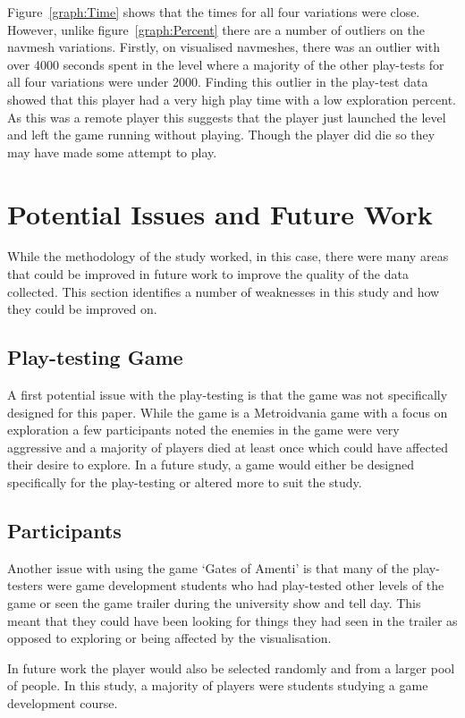 \documentclass[journal]{IEEEtran}
\begin{document}
	Figure~\ref{graph:Time} shows that the times for all four variations were close. However, unlike figure~\ref{graph:Percent} there are a number of outliers on the navmesh variations. Firstly, on visualised navmeshes, there was an outlier with over 4000 seconds spent in the level where a majority of the other play-tests for all four variations were under 2000. Finding this outlier in the play-test data showed that this player had a very high play time with a low exploration percent. As this was a remote player this suggests that the player just launched the level and left the game running without playing. Though the player did die so they may have made some attempt to play.
	
	
	\section{Potential Issues and Future Work} \label{PotentialIssues}
	While the methodology of the study worked, in this case, there were many areas that could be improved in future work to improve the quality of the data collected. This section identifies a number of weaknesses in this study and how they could be improved on. 
	
	\subsection{Play-testing Game} 
	A first potential issue with the play-testing is that the game was not specifically designed for this paper. While the game is a Metroidvania game with a focus on exploration a few participants noted the enemies in the game were very aggressive and a majority of players died at least once which could have affected their desire to explore. In a future study, a game would either be designed specifically for the play-testing or altered more to suit the study.  
	
	\subsection{Participants}
	Another issue with using the game `Gates of Amenti' is that many of the play-testers were game development students who had play-tested other levels of the game or seen the game trailer during the university show and tell day. This meant that they could have been looking for things they had seen in the trailer as opposed to exploring or being affected by the visualisation.
	
	In future work the player would also be selected randomly and from a larger pool of people. In this study, a majority of players were students studying a game development course.
	
\end{document}
